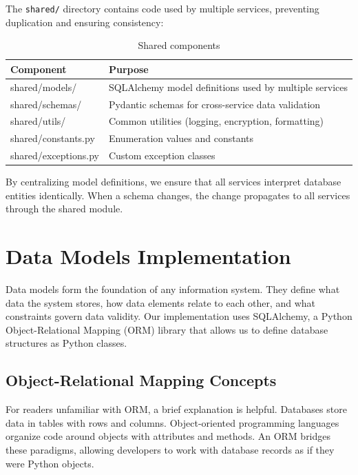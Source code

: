 \documentclass[a4paper,12pt]{report}
\begin{document}
The \texttt{shared/} directory contains code used by multiple services, preventing duplication and ensuring consistency:\hfill \break

\begin{table}[H]
\centering
\begin{tabular}{|l|l|}
\hline
\textbf{Component} & \textbf{Purpose} \\
\hline
shared/models/ & SQLAlchemy model definitions used by multiple services \\
\hline
shared/schemas/ & Pydantic schemas for cross-service data validation \\
\hline
shared/utils/ & Common utilities (logging, encryption, formatting) \\
\hline
shared/constants.py & Enumeration values and constants \\
\hline
shared/exceptions.py & Custom exception classes \\
\hline
\end{tabular}
\caption{Shared components}
\label{tab:shared_components}
\end{table}

By centralizing model definitions, we ensure that all services interpret database entities identically. When a schema changes, the change propagates to all services through the shared module.\hfill \break

\section{Data Models Implementation}

Data models form the foundation of any information system. They define what data the system stores, how data elements relate to each other, and what constraints govern data validity. Our implementation uses SQLAlchemy, a Python Object-Relational Mapping (ORM) library that allows us to define database structures as Python classes.

\subsection{Object-Relational Mapping Concepts}

For readers unfamiliar with ORM, a brief explanation is helpful. Databases store data in tables with rows and columns. Object-oriented programming languages organize code around objects with attributes and methods. An ORM bridges these paradigms, allowing developers to work with database records as if they were Python objects.\hfill \break
\end{document}
